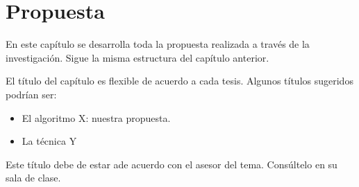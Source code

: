 \chapter{Propuesta}

En este capítulo se desarrolla toda la propuesta realizada a través de la investigación. Sigue la
misma estructura del capítulo anterior.

El título del capítulo es flexible de acuerdo a cada tesis. Algunos títulos sugeridos podrían ser:

\begin{itemize}
\item El algoritmo X: nuestra propuesta.
\item La técnica Y
\end{itemize}

Este título debe de estar ade acuerdo con el asesor del tema. Consúltelo en su sala de clase.

